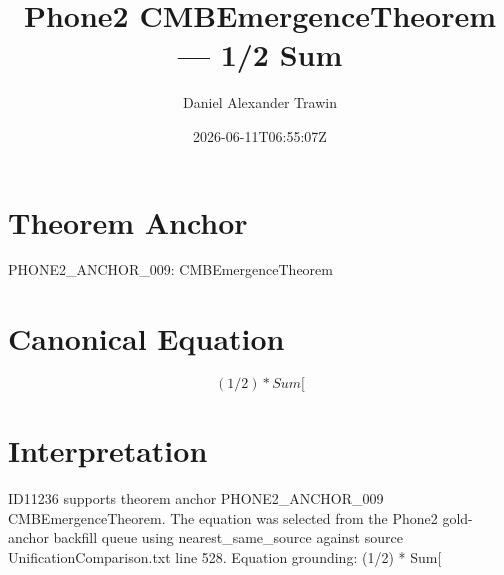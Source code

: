 \documentclass[11pt]{article}
\title{Phone2 CMBEmergenceTheorem — 1/2 Sum}
\author{Daniel Alexander Trawin}
\date{2026-06-11T06:55:07Z}
\begin{document}
\maketitle
\section*{Theorem Anchor}
PHONE2_ANCHOR_009: CMBEmergenceTheorem
\section*{Canonical Equation}
\[
(1/2) * Sum[
\]
\section*{Interpretation}
ID11236 supports theorem anchor PHONE2_ANCHOR_009 CMBEmergenceTheorem. The equation was selected from the Phone2 gold-anchor backfill queue using nearest_same_source against source UnificationComparison.txt line 528. Equation grounding: (1/2) * Sum[
\end{document}
